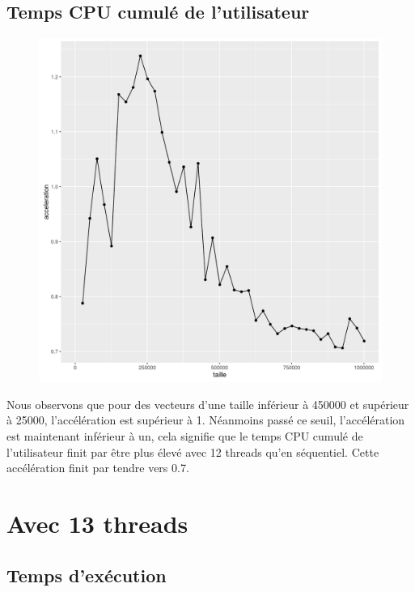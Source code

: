 \documentclass[a4paper,11pt]{scrartcl}
\begin{document}
\subsection{Temps CPU cumul\'e de l'utilisateur}
\begin{figure}[H] \center
   \includegraphics[scale=0.5] {graphes/temps_user_accel12.png}
\end{figure}
Nous observons que pour des vecteurs d'une taille inf\'erieur \`a 450000 et sup\'erieur \`a 25000, l'acc\'el\'eration est sup\'erieur \`a 1. N\'eanmoins pass\'e ce seuil,  l'acc\'el\'eration est maintenant inf\'erieur \`a un, cela signifie que le temps CPU cumul\'e de l'utilisateur finit par \^{e}tre plus \'elev\'e avec 12 threads qu'en s\'equentiel. Cette acc\'el\'eration finit par tendre vers 0.7.


\section{Avec 13 threads}
\subsection{Temps d'ex\'ecution}
\end{document}

